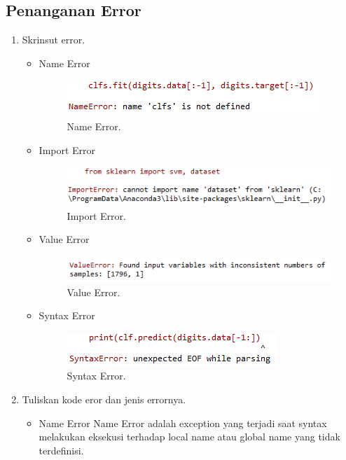 \subsection{Penanganan Error}
\begin{enumerate}
	\item Skrinsut error.
	\begin{itemize}
		\item Name Error
		\hfill\break
		\begin{figure}[H]
			\includegraphics[width=8 cm]{figures/1174006/chapter1/error/err3.PNG}
			\centering
			\caption{Name Error.}
		\end{figure}
		\item Import Error
		\hfill\break
		\begin{figure}[H]
			\includegraphics[width=8 cm]{figures/1174006/chapter1/error/err1.PNG}
			\centering
			\caption{Import Error.}
		\end{figure}
		\item Value Error
		\hfill\break
		\begin{figure}[H]
			\includegraphics[width=8 cm]{figures/1174006/chapter1/error/err2.PNG}
			\centering
			\caption{Value Error.}
		\end{figure}
		\item Syntax Error
		\hfill\break
		\begin{figure}[H]
			\includegraphics[width=8 cm]{figures/1174006/chapter1/error/err4.PNG}
			\centering
			\caption{Syntax Error.}
		\end{figure}
	\end{itemize}
	\item Tuliskan kode eror dan jenis errornya.
	\begin{itemize}
		\item Name Error
		\hfill\break
		Name Error adalah exception yang terjadi saat syntax melakukan eksekusi terhadap local name atau global name yang tidak terdefinisi.

\end{itemize}
\end{enumerate}
